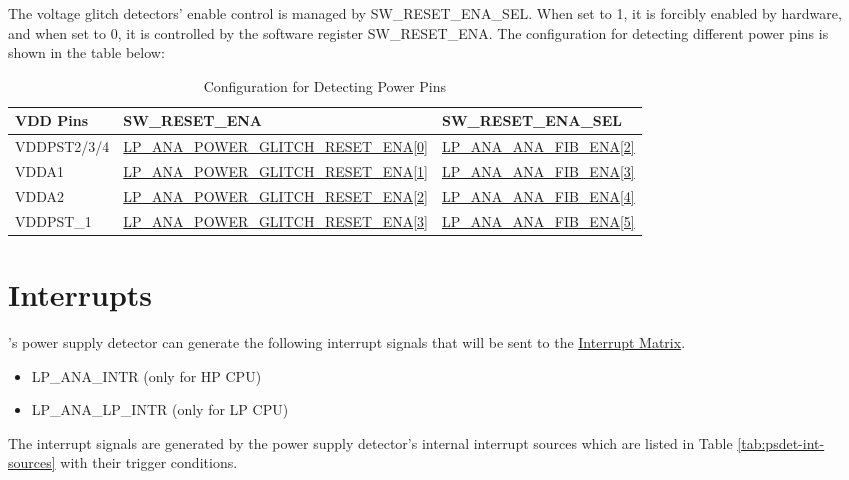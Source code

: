 \documentclass[main\_\_EN.tex]{subfiles}
\begin{document}
The voltage glitch detectors' enable control is managed by SW\_RESET\_ENA\_SEL. When set to 1, it is forcibly enabled by hardware, and when set to 0, it is controlled by the software register SW\_RESET\_ENA. The configuration for detecting different power pins is shown in the table below:

\begin{longtable}{ | l | l | l | }
\caption{Configuration for Detecting Power Pins} \label{tab:psdet-power-detec-pins}
\\ \hline
\rowcolor{lightgray}
\textbf{VDD Pins} & \textbf{SW\_RESET\_ENA}  &  \textbf{SW\_RESET\_ENA\_SEL}\\ \hline
VDDPST2/3/4 & \hyperref[fielddesc:LPANAPOWERGLITCHRESETENA]{LP\_ANA\_POWER\_GLITCH\_RESET\_ENA[0]} & \hyperref[fielddesc:LPANAANAFIBENA]{LP\_ANA\_ANA\_FIB\_ENA[2]} \\\hline
VDDA1 & \hyperref[fielddesc:LPANAPOWERGLITCHRESETENA]{LP\_ANA\_POWER\_GLITCH\_RESET\_ENA[1]} & \hyperref[fielddesc:LPANAANAFIBENA]{LP\_ANA\_ANA\_FIB\_ENA[3]} \\\hline
VDDA2 & \hyperref[fielddesc:LPANAPOWERGLITCHRESETENA]{LP\_ANA\_POWER\_GLITCH\_RESET\_ENA[2]} & \hyperref[fielddesc:LPANAANAFIBENA]{LP\_ANA\_ANA\_FIB\_ENA[4]} \\\hline
VDDPST\_1 & \hyperref[fielddesc:LPANAPOWERGLITCHRESETENA]{LP\_ANA\_POWER\_GLITCH\_RESET\_ENA[3]} & \hyperref[fielddesc:LPANAANAFIBENA]{LP\_ANA\_ANA\_FIB\_ENA[5]} \\\hline
\end{longtable}



\section{Interrupts}

\chipname{}'s power supply detector can generate the following interrupt signals that will be sent to the \hyperref[mod:intmtrx]{Interrupt Matrix}.

    \begin{itemize}
        \item LP\_ANA\_INTR (only for HP CPU)
        \item LP\_ANA\_LP\_INTR (only for LP CPU)
    \end{itemize}

The interrupt signals are generated by the power supply detector's internal interrupt sources which are listed in Table \ref{tab:psdet-int-sources} with their trigger conditions.
\end{document}
